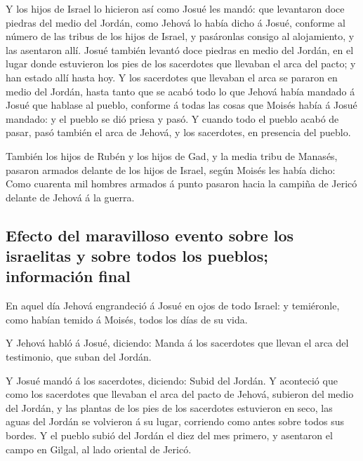  Y los hijos de Israel lo hicieron así como Josué les
mandó: que levantaron doce piedras del medio del Jordán, como Jehová lo
había dicho á Josué, conforme al número de las tribus de los hijos de
Israel, y pasáronlas consigo al alojamiento, y las asentaron allí.
 Josué también levantó doce piedras en medio del Jordán,
en el lugar donde estuvieron los pies de los sacerdotes que llevaban el
arca del pacto; y han estado allí hasta hoy.  Y los
sacerdotes que llevaban el arca se pararon en medio del Jordán, hasta
tanto que se acabó todo lo que Jehová había mandado á Josué que hablase
al pueblo, conforme á todas las cosas que Moisés había á Josué mandado:
y el pueblo se dió priesa y pasó.  Y cuando todo el
pueblo acabó de pasar, pasó también el arca de Jehová, y los sacerdotes,
en presencia del pueblo.

 También los hijos de Rubén y los hijos de Gad, y la
media tribu de Manasés, pasaron armados delante de los hijos de Israel,
según Moisés les había dicho:  Como cuarenta mil hombres
armados á punto pasaron hacia la campiña de Jericó delante de Jehová á
la guerra.

\hypertarget{efecto-del-maravilloso-evento-sobre-los-israelitas-y-sobre-todos-los-pueblos-informaciuxf3n-final}{%
\subsection{Efecto del maravilloso evento sobre los israelitas y sobre
todos los pueblos; información
final}\label{efecto-del-maravilloso-evento-sobre-los-israelitas-y-sobre-todos-los-pueblos-informaciuxf3n-final}}

 En aquel día Jehová engrandeció á Josué en ojos de todo
Israel: y temiéronle, como habían temido á Moisés, todos los días de su
vida.

 Y Jehová habló á Josué, diciendo:  Manda
á los sacerdotes que llevan el arca del testimonio, que suban del
Jordán.

 Y Josué mandó á los sacerdotes, diciendo: Subid del
Jordán.  Y aconteció que como los sacerdotes que llevaban
el arca del pacto de Jehová, subieron del medio del Jordán, y las
plantas de los pies de los sacerdotes estuvieron en seco, las aguas del
Jordán se volvieron á su lugar, corriendo como antes sobre todos sus
bordes.  Y el pueblo subió del Jordán el diez del mes
primero, y asentaron el campo en Gilgal, al lado oriental de Jericó.

